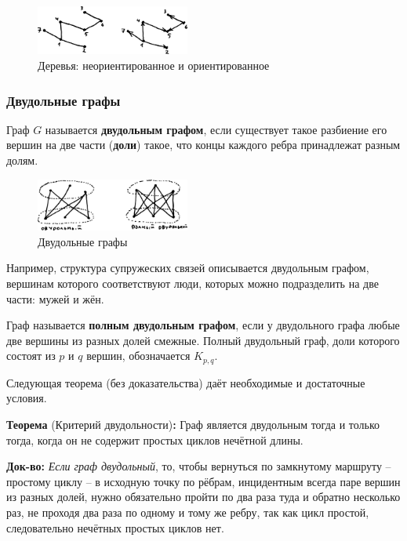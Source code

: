\documentclass[12pt, a4paper]{article}
\begin{document}
\begin{figure}[h]
 \centering
 \includegraphics[width=0.45\textwidth]{41}
 \vspace{-4mm}
 \caption{Деревья: неориентированное и ориентированное}
\end{figure}

\subsubsection{Двудольные графы}

Граф $G$ называется \textbf{двудольным графом}, если существует такое разбиение его вершин на две части (\textbf{доли}) такое, что концы каждого ребра принадлежат разным долям.

\begin{figure}[h]
 \centering
 \includegraphics[width=0.45\textwidth]{42}
 \vspace{-4mm}
 \caption{Двудольные графы}
\end{figure}

Например, структура супружеских связей описывается двудольным графом, вершинам которого соответствуют люди, которых можно подразделить на две части: мужей и жён.

Граф называется \textbf{полным двудольным графом}, если у двудольного графа любые две вершины из разных долей смежные. Полный двудольный граф, доли которого состоят из $p$ и $q$ вершин, обозначается $K_{p,q}$.

Следующая теорема (без доказательства) даёт необходимые и достаточные условия.

\textbf{Теорема} (Критерий двудольности)\textbf{:} Граф является двудольным тогда и только тогда, когда он не содержит простых циклов нечётной длины.

\textbf{Док-во:} \textit{Если граф двудольный}, то, чтобы вернуться по замкнутому маршруту -- простому циклу -- в исходную точку по рёбрам, инцидентным всегда паре вершин из разных долей, нужно обязательно пройти по два раза туда и обратно несколько раз, не проходя два раза по одному и тому же ребру, так как цикл простой, следовательно нечётных простых циклов нет.
\end{document}
